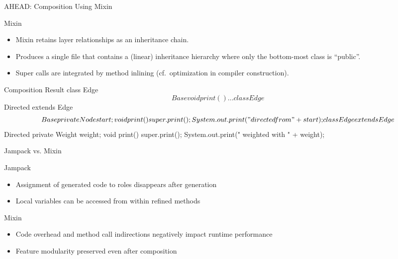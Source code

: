 \begin{frame}[fragile]{AHEAD: Composition Using Mixin}
	\begin{mycolumns}[widths={50,50},animation=none]
		\begin{definition}{Mixin}
			\begin{itemize}
				\item Mixin retains layer relationships as an inheritance chain.  
				\item Produces a single file that contains a (linear) inheritance hierarchy where only the bottom-most class is ``public''.
				\item Super calls are integrated by method inlining (cf.\ optimization in compiler construction).
			\end{itemize}
		\end{definition}
	\mynextcolumn
{\small
\begin{codetight}{Composition Result}
class Edge$$Base {
	void print() { ... }
}
class Edge$$Directed extends Edge$$Base {
	private Node start;
	void print() {
		super.print();
		System.out.print(" directed from " + start);
	}
}
class Edge extends Edge$$Directed {
	private Weight weight;
	void print() {
		super.print();
		System.out.print(" weighted with " + weight);
	}
}
\end{codetight}
}
	\end{mycolumns}
\end{frame}

\begin{frame}{Jampack vs. Mixin}
	\begin{mycolumns}[widths={50,50},animation=none]
		\begin{note}{Jampack}
			\begin{itemize}
				\item Assignment of generated code to roles disappears after generation 
				\item Local variables can be accessed from within refined methods
			\end{itemize}
		\end{note}
	\mynextcolumn
		\begin{note}{Mixin}
			\begin{itemize}
				\item Code overhead and method call indirections negatively impact runtime performance
				\item Feature modularity preserved even after composition
			\end{itemize}
		\end{note}
	\end{mycolumns}
\end{frame}

